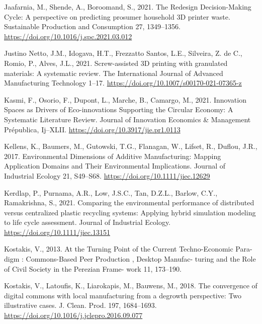 \documentclass[12pt]{elsarticle} %
\newlength{\cslhangindent}
\newlength{\cslentryspacingunit} %
\newenvironment{CSLReferences}[2] %
 {%
  \setlength{\parindent}{0pt}
  \ifodd #1
  \let\oldpar\par
  \def\par{\hangindent=\cslhangindent\oldpar}
  \fi
  \setlength{\parskip}{#2\cslentryspacingunit}
 }%
 {}
\begin{document}
\begin{CSLReferences}{1}{0}
\leavevmode{}%
Jaafarnia, M., Shende, A., Boroomand, S., 2021. The {Redesign Decision-Making Cycle}: {A} perspective on predicting prosumer household {3D} printer waste. Sustainable Production and Consumption 27, 1349--1356. \url{https://doi.org/10.1016/j.spc.2021.03.012}

\leavevmode{}%
Justino Netto, J.M., Idogava, H.T., Frezzatto Santos, L.E., Silveira, Z. de C., Romio, P., Alves, J.L., 2021. Screw-assisted {3D} printing with granulated materials: A systematic review. The International Journal of Advanced Manufacturing Technology 1--17. \url{https://doi.org/10.1007/s00170-021-07365-z}

\leavevmode{}%
Kasmi, F., Osorio, F., Dupont, L., Marche, B., Camargo, M., 2021. Innovation {Spaces} as {Drivers} of {Eco-innovations Supporting} the {Circular Economy}: {A Systematic Literature Review}. Journal of Innovation Economics \& Management Prépublica, Ij--XLII. \url{https://doi.org/10.3917/jie.pr1.0113}

\leavevmode{}%
Kellens, K., Baumers, M., Gutowski, T.G., Flanagan, W., Lifset, R., Duflou, J.R., 2017. Environmental {Dimensions} of {Additive Manufacturing}: {Mapping Application Domains} and {Their Environmental Implications}. Journal of Industrial Ecology 21, S49--S68. \url{https://doi.org/10.1111/jiec.12629}

\leavevmode{}%
Kerdlap, P., Purnama, A.R., Low, J.S.C., Tan, D.Z.L., Barlow, C.Y., Ramakrishna, S., 2021. Comparing the environmental performance of distributed versus centralized plastic recycling systems: {Applying} hybrid simulation modeling to life cycle assessment. Journal of Industrial Ecology. \url{https://doi.org/10.1111/jiec.13151}

\leavevmode{}%
Kostakis, V., 2013. At the {Turning Point} of the {Current Techno-Economic Para-} digm : {Commons-Based Peer Production} , {Desktop Manufac-} turing and the {Role} of {Civil Society} in the {Perezian Frame-} work 11, 173--190.

\leavevmode{}%
Kostakis, V., Latoufis, K., Liarokapis, M., Bauwens, M., 2018. The convergence of digital commons with local manufacturing from a degrowth perspective: {Two} illustrative cases. J. Clean. Prod. 197, 1684--1693. \url{https://doi.org/10.1016/j.jclepro.2016.09.077}


\end{CSLReferences}
\end{document}
